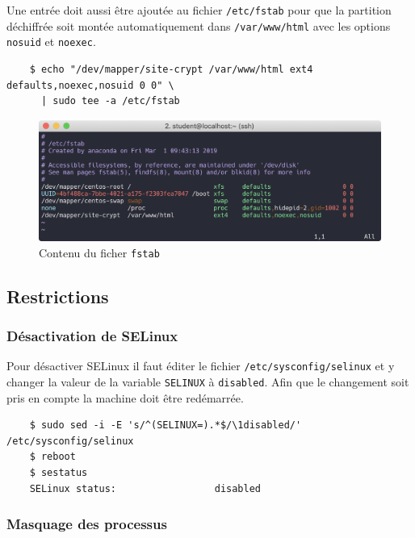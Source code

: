 \documentclass{extarticle} %
\begin{document}
    Une entrée doit aussi être ajoutée au fichier \texttt{/etc/fstab} pour que la partition déchiffrée soit montée
     automatiquement dans \texttt{/var/www/html} avec les options \texttt{nosuid} et \texttt{noexec}.

    \begin{verbatim}
    $ echo "/dev/mapper/site-crypt /var/www/html ext4 defaults,noexec,nosuid 0 0" \
      | sudo tee -a /etc/fstab
    \end{verbatim}

    \begin{figure}[H]
      \centering
      \includegraphics[scale=0.6]{img/fstab.png}
      \caption{Contenu du ficher \texttt{fstab}}
    \end{figure}

    \subsection{Restrictions}
    \subsubsection{Désactivation de SELinux}

    Pour désactiver SELinux il faut éditer le fichier \texttt{/etc/sysconfig/selinux} et y changer la valeur
     de la variable \texttt{SELINUX} à \texttt{disabled}. Afin que le changement soit pris en compte la machine doit être redémarrée.

    \begin{verbatim}
    $ sudo sed -i -E 's/^(SELINUX=).*$/\1disabled/' /etc/sysconfig/selinux
    $ reboot
    $ sestatus
    SELinux status:                 disabled
    \end{verbatim}

    \subsubsection{Masquage des processus}
\end{document}
